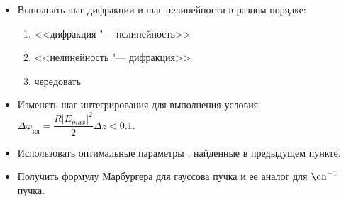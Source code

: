 \begin{itemize}
	\item Выполнять шаг дифракции и шаг нелинейности в разном порядке:
	\begin{enumerate}
		\item <<дифракция "--- нелинейность>>
		\item <<нелинейность "--- дифракция>>
		\item чередовать
	\end{enumerate}
	\item Изменять шаг интегрирования для выполнения условия $\Delta\varphi_{\text{нл}}=\dfrac{R\left|E_{max}\right|^2}{2}\Delta z < 0.1$.
	\item Использовать оптимальные параметры \fftw, найденные в предыдущем пункте.
	\item Получить формулу Марбургера для гауссова пучка и ее аналог для $\ch^{-1}$ пучка.
\end{itemize}

